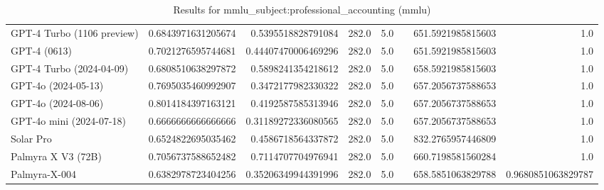\begin{table}[htp]
{\begin{tabular}{lrrrrrrr}
GPT-4 Turbo (1106 preview) & 0.6843971631205674 & 0.5395518828791084 & 282.0 & 5.0 &  & 651.5921985815603 & 1.0 \\
GPT-4 (0613) & 0.7021276595744681 & 0.44407470006469296 & 282.0 & 5.0 &  & 651.5921985815603 & 1.0 \\
GPT-4 Turbo (2024-04-09) & 0.6808510638297872 & 0.5898241354218612 & 282.0 & 5.0 &  & 658.5921985815603 & 1.0 \\
GPT-4o (2024-05-13) & 0.7695035460992907 & 0.3472177982330322 & 282.0 & 5.0 &  & 657.2056737588653 & 1.0 \\
GPT-4o (2024-08-06) & 0.8014184397163121 & 0.4192587585313946 & 282.0 & 5.0 &  & 657.2056737588653 & 1.0 \\
GPT-4o mini (2024-07-18) & 0.6666666666666666 & 0.31189272336080565 & 282.0 & 5.0 &  & 657.2056737588653 & 1.0 \\
Solar Pro & 0.6524822695035462 & 0.4586718564337872 & 282.0 & 5.0 &  & 832.2765957446809 & 1.0 \\
Palmyra X V3 (72B) & 0.7056737588652482 & 0.7114707704976941 & 282.0 & 5.0 &  & 660.7198581560284 & 1.0 \\
Palmyra-X-004 & 0.6382978723404256 & 0.35206349944391996 & 282.0 & 5.0 &  & 658.5851063829788 & 0.9680851063829787 \\
\bottomrule
\end{tabular}}
\caption{Results for mmlu_subject:professional_accounting (mmlu)}
\label{fig:mmlu_subject:professional_accounting (mmlu)}
\end{table}